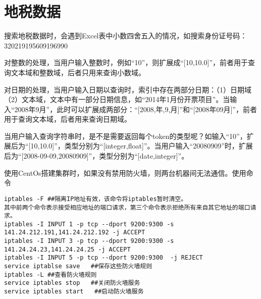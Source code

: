 \section{地税数据}
\par 搜索地税数据时，会遇到Excel表中小数四舍五入的情况，如搜索身份证号码：320219195609196990
\par 对整数的处理，当用户输入整数时，例如“10”，则扩展成“[10,10.0]”，前者用于查询文本域和整数域，后者只用来查询小数域。
\par 对日期的处理，当用户输入日期以查询时，索引中存在两部分日期：（1）日期域（2）文本域，文本中有一部分日期信息，如“2014年1月份开票项目”。当输入“2008年9月”，此时可以扩展成两部分：“[2008,年,9,月]”和“[2008年09月]”，前者用于查询文本域，后者用来查询日期域。
\par 当用户输入查询字符串时，是不是需要返回每个token的类型呢？如输入“10”，扩展后为“[10,10.0]”，类型分别为“[integer,float]”。当用户输入“20080909”时，扩展后为“[2008-09-09,20080909]”，类型分别为“[date,integer]”。
\par 使用CentOs搭建集群时，如果没有禁用防火墙，则两台机器间无法通信。使用命令
\begin{verbatim}
iptables -F ##隔离IP地址有效，该命令将iptables暂时清空。
其中前两个命令表示接受相应地址的端口请求，第三个命令表示拒绝所有来自其它地址的端口请求。
iptables -I INPUT 1 -p tcp --dport 9200:9300 -s 141.24.212.191,141.24.212.192 -j ACCEPT
iptables -I INPUT 3 -p tcp --dport 9200:9300 -s 141.24.24.23,141.24.24.25 -j ACCEPT
iptables -I INPUT 5 -p tcp --dport 9200:9300  -j REJECT
service iptablse save   ##保存这些防火墙规则
iptables -L ##查看防火墙规则
service iptables stop   ##关闭防火墙服务
service iptables start   ##启动防火墙服务
\end{verbatim}

